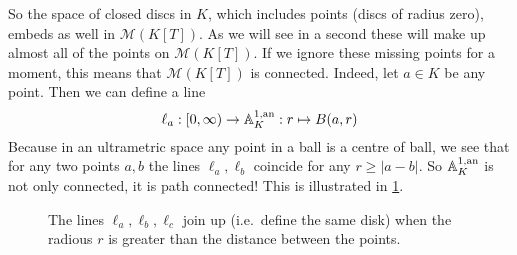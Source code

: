 So the space of closed discs in $K$, which includes points (discs of radius zero), embeds as well in $\mathcal{M} (K[T])$. 
As we will see in a second these will make up almost all of the points on $\mathcal{M} (K[T])$. 
If we ignore these missing points for a moment, this means that $\mathcal{M}(K[T])$ is connected. 
Indeed, let $a \in K$ be any point. Then we can define a line \begin{equation}\label{eq:line_in_A_1}
	\ell_a: [0, \infty) \to  \mathbb{A}_K^{1, \text{an}}: r\mapsto B(a, r)
\end{equation}
Because in an ultrametric space any point in a ball is a centre of ball, we see that for any two points $a, b$ the lines $\ell_a, \ell_b$ coincide for any $r \ge |a - b|$. 
So $\mathbb{A}_K^{1,\text{an}}$ is not only connected, it is path connected!
This is illustrated in \cref{fig:the_lines_la_lb_lc}. 
\begin{figure}[h]
    \centering
    \caption{The lines $\ell_a, \ell_b, \ell_c$ join up (i.e.\ define the same disk) when the radious $r$ is greater than the distance between the points.}
    \label{fig:the_lines_la_lb_lc}
\end{figure}

